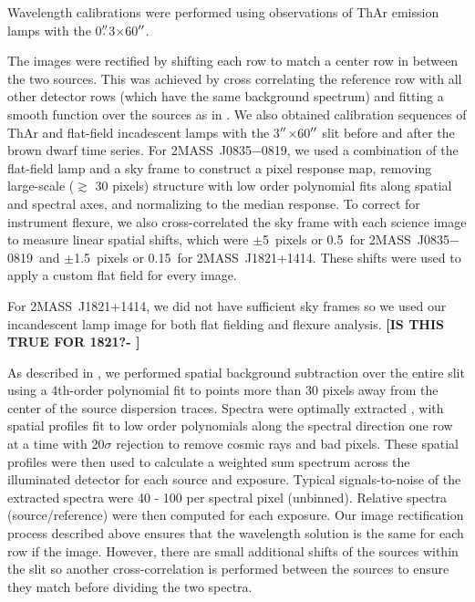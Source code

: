\documentclass[twocolumn]{aastex6}
\newcommand{\sha}{2MASS~J0835$-$0819}
\newcommand{\shb}{2MASS~J1821+1414}
\begin{document}
Wavelength calibrations were performed using observations of ThAr emission lamps with the 0$\mbox{$.\!\!^{\prime\prime}$}$3$\times$60$\mbox{$^{\prime\prime}$}$.

The images were rectified by shifting each row to match a center row in between the two sources.
This was achieved by cross correlating the reference row with all other detector rows (which have the same background spectrum) and fitting a smooth function over the sources as in \citealt{2016ApJ...826..156S}.
We also obtained calibration sequences of ThAr and flat-field incadescent lamps with the 3$\mbox{$^{\prime\prime}$}$$\times$60$\mbox{$^{\prime\prime}$}$ slit  before and after the brown dwarf time series.
For {\sha}, we used a combination of the flat-field lamp and a sky frame to construct a pixel response map, removing large-scale ($\gtrsim$ 30 pixels) structure with low order polynomial fits along spatial and spectral axes, and normalizing to the median response. 
To correct for instrument flexure, we also cross-correlated the sky frame with each science image to measure linear spatial shifts, which were $\pm$5~pixels or 0.5\arcsec\ for \sha\ and $\pm$1.5~pixels or 0.15\arcsec\ for \shb.
These shifts were used to apply a custom flat field for every image.

For {\shb}, we did not have sufficient sky frames so we used our incandescent lamp image for both flat fielding and flexure analysis. {\bf [IS THIS TRUE FOR 1821?- \color{red}{YES, there were only 5 good sky frames at the end and 3 at the beginning.}]}

As described in \citet{2016ApJ...826..156S}, we performed spatial background subtraction over the entire slit using a 4th-order polynomial fit to points more than 30 pixels away from the center of the source dispersion traces.  Spectra were optimally extracted \citep{1986ApJ...302..757H}, with spatial profiles fit to low order polynomials along the spectral direction one row at a time with 20$\sigma$ rejection to remove cosmic rays and bad pixels.
These spatial profiles were then used to calculate a weighted sum spectrum across the illuminated detector for each source and exposure. 
Typical signals-to-noise of the extracted spectra were 40 - 100 per spectral pixel (unbinned).
Relative spectra (source/reference) were then computed for each exposure.
Our image rectification process described above ensures that the wavelength solution is the same for each row if the image.
However, there are small additional shifts of the sources within the slit so another cross-correlation is performed between the sources to ensure they match before dividing the two spectra.
\end{document}
